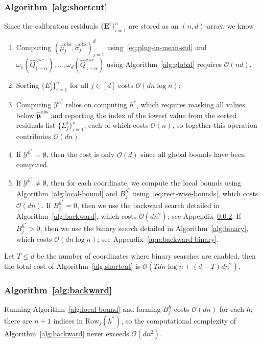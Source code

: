 \subsubsection{Algorithm~\ref{alg:shortcut}}
\label{app:lwc-sc-cost}
Since the calibration residuals $\{\mathbf{E}^i\}_{i=1}^{n}$ are stored as an $(n,d)$-array, we know
\begin{enumerate}
    \item Computing $(\hat\mu^{\mathrm{obs}}_j,\hat\sigma^{\mathrm{obs}}_j)_{j=1}^d$ using~\eqref{eq:plug-in-mean-std} and $\omega_1(\hat{Q}^{\mathrm{gwc}}_{1-\alpha}),\ldots,\omega_d(\hat{Q}^{\mathrm{gwc}}_{1-\alpha})$ using Algorithm~\ref{alg:global} requires $\mathcal O(nd)$.
    \item Sorting $\{E^i_j\}^n_{i=1}$ for all $j\in [d]$ costs $\mathcal{O}(dn\log{n})$;
    \item Computing $\mathcal{Y}^{h^*}$ relies on computing $h^*$, which requires masking all values below $\hat{\boldsymbol\mu}^{\mathrm{obs}}$ and reporting the index of the lowest value from the sorted residuals list $\{E^i_j\}^n_{i=1}$, each of which costs $\mathcal{O}(n)$, so together this operation contributes $\mathcal{O}(dn)$.
    \item If $\mathcal{Y}^{h^*} = \emptyset$, then the cost is only $\mathcal{O}(d)$ since all global bounds have been computed.
    \item If $\mathcal{Y}^{h^*} \neq \emptyset$, then for each coordinate, we compute the local bounds using Algorithm~\ref{alg:local-bound} and $B^{h^*}_j$ using~\eqref{eq:rect-wise-bounds}, which costs $\mathcal{O}(dn)$.
    If $B^{h^*}_j = 0$, then we use the backward search detailed in Algorithm~\ref{alg:backward}, which costs $\mathcal{O}(dn^2)$; see Appendix~\ref{app:backward-backward}.
    If $B^{h^*}_j > 0$, then we use the binary search detailed in Algorithm~\ref{alg:binary}, which costs $\mathcal{O}(dn\log{n})$; see Appendix~\ref{app:backward-binary}.
\end{enumerate}  
Let $T \leq d$ be the number of coordinates where binary searches are enabled, then the total cost of Algorithm~\ref{alg:shortcut} is $\mathcal{O}(Tdn\log{n} + (d-T)dn^2)$.

\subsubsection{Algorithm~\ref{alg:backward}} \label{app:backward-backward}
Running Algorithm~\ref{alg:local-bound} and forming $B^h_j$ costs $\mathcal{O}(dn)$ for each $h$; there are $n+1$ indices in
$\mathrm{Row}_j(h^*)$, so the computational complexity of Algorithm~\ref{alg:backward} never exceeds $\mathcal{O}(dn^2)$.

